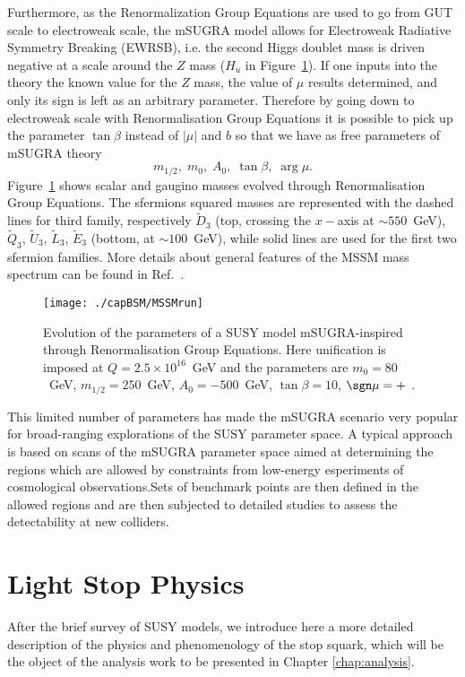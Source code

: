 Furthermore, as the Renormalization Group Equations are used to go from GUT scale to electroweak scale, the mSUGRA model allows for Electroweak Radiative Symmetry Breaking (EWRSB), i.e. the second Higgs doublet mass is driven negative at a scale around the $Z$ mass ($H_u$ in Figure~\ref{RGEmasses}). If one inputs into the theory the known value for the $Z$ mass, the value of $\mu$ results determined, and only its sign is left as an arbitrary parameter. Therefore by going down to electroweak scale with Renormalisation Group Equations it is possible to pick up the parameter $\tan\beta$ instead of $|\mu|$ and $b$ so that we have as free parameters of mSUGRA theory\begin{equation}\label{eq:mSUGRAparam}
m_{1/2},\; m_{0},\; A_{0},\; \tan\beta,\; \arg\mu.
\end{equation} Figure~\ref{RGEmasses} shows scalar and gaugino masses evolved through Renormalisation Group Equations. The sfermions squared masses are represented with the dashed lines for third family, respectively $\tilde D_3$ (top, crossing the $x-$axis at $\sim550$~GeV), $\tilde Q_3$, $\tilde U_3$, $\tilde L_3$, $\tilde E_3$ (bottom, at $\sim100$~GeV), while solid lines are used for the first two sfermion families. More details about general features of the MSSM mass spectrum can be found in Ref.~\cite{Martin}.

\begin{figure}[htb]\begin{center}\texttt{[image: ./capBSM/MSSMrun]}\caption{Evolution of the parameters of a SUSY model mSUGRA-inspired through Renormalisation Group Equations. Here unification is imposed at $Q=2.5\times10^{16}$~GeV and the parameters are $m_0 = 80$~GeV, $m_{1/2}=250$~GeV, $A_0=-500 $~GeV, $\tan\beta=10$, $\sgn\mu=+$ \cite{Martin}.}\label{RGEmasses} \end{center}\end{figure}

This limited number of parameters has made the mSUGRA scenario very popular for broad-ranging explorations of the SUSY parameter space. A typical approach is based on  scans of the mSUGRA  parameter space aimed at determining the regions which are allowed by constraints from low-energy esperiments of cosmological observations.Sets of benchmark points are then defined in the allowed regions and are then subjected to detailed studies to assess the detectability at new colliders.

\section{Light Stop Physics}\label{sect:stopPhys}
After the brief survey of SUSY models, we introduce here a more detailed description of the physics and phenomenology of the stop squark, which will be the object of the analysis work to be presented in Chapter \ref{chap:analysis}.


